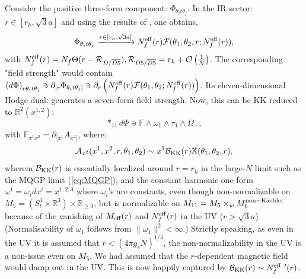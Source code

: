 \documentclass[a4paper,11pt,fleqn]{article}
\theoremstyle{plain}
\theoremstyle{definition}
\begin{document}
Consider the positive three-form component: $\Phi_{\theta_i t\theta_j}$.
In the IR sector: $r\in[r_h,\sqrt{3}a]$ and using the results of \cite{OR4}, one obtains,
\begin{equation}
\label{B-M-theory-1}
\Phi_{\theta_i t\theta_j}\xrightarrow{r\in[r_h,\sqrt{3}a]}
N_f^{\rm eff}(r){\cal F}(\theta_1, \theta_2, r; N_f^{\rm eff}(r)),
\end{equation}
with $N_f^{\rm eff}(r) = N_f\Theta(r - {\cal R}_{D/\overline{D5}}), {\cal R}_{D5/\overline{D5}} = r_h + {\cal O}\left(\frac{1}{N}\right)$.
The corresponding "field strength" would contain $\left(d\Phi\right)_{r\theta_i t\theta_j}\ni\partial_{[r}\Phi_{\theta_i t\theta_j]}\ni \partial_r\left( N_f^{\rm eff}(r){\cal F}(\theta_1,\theta_2; N_f^{\rm eff}(r))\right)$. 
Its eleven-dimensional Hodge dual: 
generates a seven-form field strength. Now, this can be KK reduced to $\mathbb{R}^2(x^{1,2})$:
\begin{equation}
\label{KK-Hodge dPhi}
*_{11}d\Phi\ni\mathbb{F}\wedge\omega_1\wedge\tau_1\wedge\Omega_+,
\end{equation}
with $\mathbb{F}_{x^1x^2} =\partial_{[x^1}A_{x^2]} $, where:
\begin{equation}
\label{B-M-theory-2}
{\cal A}_{x^2}(x^1, x^2, r, \theta_1, \theta_2) \sim x^1 {\cal B}_{\rm KK}(r) \mathbb{X}(\theta_1,\theta_2, r),
\end{equation}
wherein ${\cal B}_{\rm KK}(r)$ is essentially localized around $r=r_h$ in the large-$N$ limit such as the MQGP limit (\ref{eq:MQGP}), and the constant harmonic one-form $\omega^1 = \omega_i dx^i = x^{1, 2, 3}$ where $\omega_i$'s are constants, even though non-normalizable on $M_5=\left(S^1_t \times \mathbb{R}^3\right)\times\mathbb{R}_{\geq0}$, but is normalizable on $M_{11} =M_5\times_w M_6^{\rm non-Kaehler}$ because of the vanishing of $M_{\rm eff}(r)$ and $N_f^{\rm eff}(r)$ in the UV ($r>\sqrt{3}a$)
 (Normalisability of $\omega_1$ follows from $\|\omega_1\|^2<\infty$.) Strictly speaking, as even in the UV it is assumed that $r<\left(4\pi g_s N\right)^{1/4}$, the non-normalizability in the UV is a non-issue even on $M_5$. We had assumed that the $r$-dependent magnetic field would damp out in the UV. This is now happily captured by $\mathcal{B}_{\rm KK}(r)\sim N_f^{\rm eff}\ '(r)$. 
\end{document}
